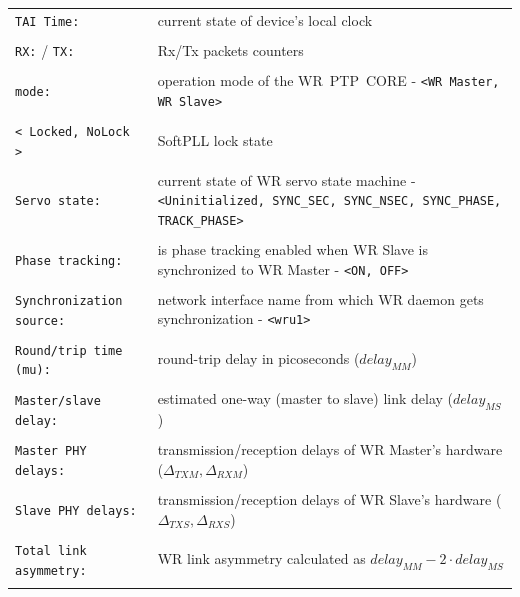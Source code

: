 \documentclass[a4paper, 12pt]{article}
\newcommand{\code}[1]{\texttt{#1}}
\newcommand{\codeHook}[1]{\mbox{\ttfamily\MakeTextUppercase{#1}}}
\begin{document}
\footnotesize
\begin{longtable}{  p{8cm}  p{6cm} }

  \code{TAI Time:} & current state of device's local clock \\
 & \\
  \code{RX:} / \code{TX:} & Rx/Tx packets counters\\
 & \\
  \code{mode:} & operation mode of the \codeHook{wr ptp core} - \code{<WR Master, WR Slave>}\\
 & \\
  \code{< Locked, NoLock >} & SoftPLL lock state\\
 & \\

  \code{Servo state:} & current state of \codeHook{wr} servo state machine -
\code{<Uninitialized, SYNC\_SEC, SYNC\_NSEC, SYNC\_PHASE, TRACK\_PHASE>}\\
 & \\

  \code{Phase tracking:} & is phase tracking enabled when \codeHook{wr} Slave is
synchronized to \codeHook{wr} Master - \code{<ON, OFF>}\\
 & \\
  \code{Synchronization source:} & network interface name from which \codeHook{wr}
daemon gets synchronization - \code{<wru1>}\\
 & \\

  \code{Round\-/trip time (mu):} & round-trip delay in picoseconds
(\( delay_{MM} \))\\
 & \\

  \code{Master\-/slave delay:} & estimated one-way (master to slave) link
delay (\( delay_{MS} \))\\
 & \\

  \code{Master PHY delays:} & transmission/reception delays of \codeHook{wr}
Master's hardware (\( \Delta_{TXM}, \Delta_{RXM} \))\\
 & \\

  \code{Slave PHY delays:} & transmission/reception delays of \codeHook{wr} Slave's
hardware (\( \Delta_{TXS}, \Delta_{RXS} \))\\
 & \\

  \code{Total link asymmetry:} & \codeHook{wr} link asymmetry calculated as
\( delay_{MM} - 2 \cdot delay_{MS} \)\\
 & \\


\end{longtable}
\end{document}
